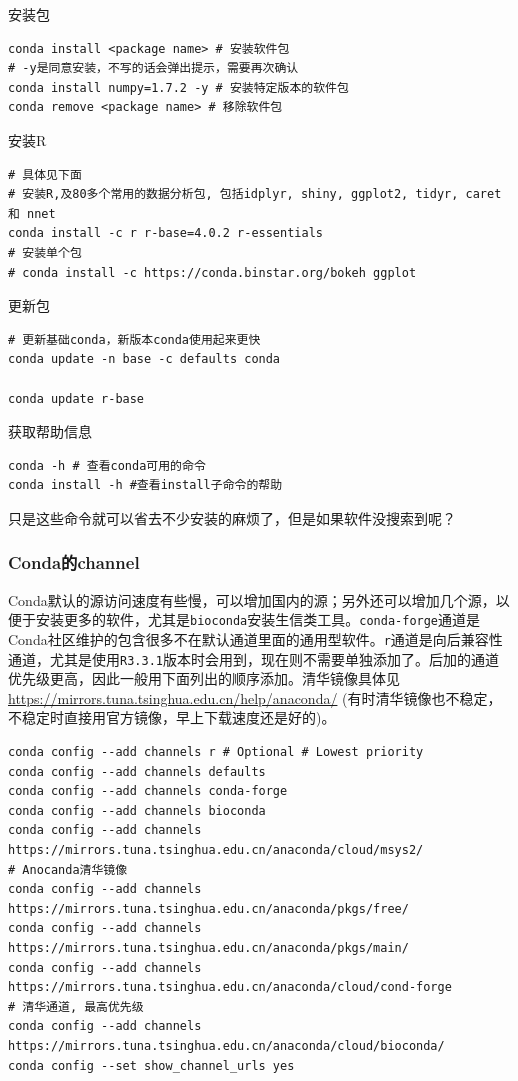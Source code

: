 \documentclass[]{article}
\numberwithin{figure}{section}
\numberwithin{table}{section}
\begin{document}
安装包

\begin{verbatim}
conda install <package name> # 安装软件包
# -y是同意安装，不写的话会弹出提示，需要再次确认
conda install numpy=1.7.2 -y # 安装特定版本的软件包
conda remove <package name> # 移除软件包
\end{verbatim}

安装R

\begin{verbatim}
# 具体见下面
# 安装R,及80多个常用的数据分析包, 包括idplyr, shiny, ggplot2, tidyr, caret 和 nnet
conda install -c r r-base=4.0.2 r-essentials 
# 安装单个包
# conda install -c https://conda.binstar.org/bokeh ggplot 
\end{verbatim}

更新包

\begin{verbatim}
# 更新基础conda，新版本conda使用起来更快
conda update -n base -c defaults conda

conda update r-base
\end{verbatim}

获取帮助信息

\begin{verbatim}
conda -h # 查看conda可用的命令
conda install -h #查看install子命令的帮助
\end{verbatim}

只是这些命令就可以省去不少安装的麻烦了，但是如果软件没搜索到呢？

\hypertarget{conda_channel}{%
\subsubsection{Conda的channel}\label{conda_channel}}

Conda默认的源访问速度有些慢，可以增加国内的源；另外还可以增加几个源，以便于安装更多的软件，尤其是\texttt{bioconda}安装生信类工具。\texttt{conda-forge}通道是Conda社区维护的包含很多不在默认通道里面的通用型软件。\texttt{r}通道是向后兼容性通道，尤其是使用\texttt{R3.3.1}版本时会用到，现在则不需要单独添加了。后加的通道优先级更高，因此一般用下面列出的顺序添加。清华镜像具体见\url{https://mirrors.tuna.tsinghua.edu.cn/help/anaconda/} (有时清华镜像也不稳定，不稳定时直接用官方镜像，早上下载速度还是好的)。

\begin{verbatim}
conda config --add channels r # Optional # Lowest priority
conda config --add channels defaults
conda config --add channels conda-forge 
conda config --add channels bioconda 
conda config --add channels https://mirrors.tuna.tsinghua.edu.cn/anaconda/cloud/msys2/
# Anocanda清华镜像
conda config --add channels https://mirrors.tuna.tsinghua.edu.cn/anaconda/pkgs/free/ 
conda config --add channels https://mirrors.tuna.tsinghua.edu.cn/anaconda/pkgs/main/ 
conda config --add channels  https://mirrors.tuna.tsinghua.edu.cn/anaconda/cloud/cond-forge
# 清华通道, 最高优先级
conda config --add channels https://mirrors.tuna.tsinghua.edu.cn/anaconda/cloud/bioconda/ 
conda config --set show_channel_urls yes
\end{verbatim}
\end{document}
